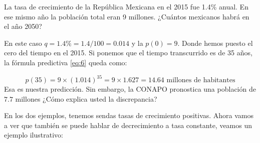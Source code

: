 \begin{ejemplo}

		\noindent La tasa de crecimiento de la República Mexicana en el 2015 fue 1.4\% anual. En ese mismo año la población total eran 9 millones. ¿Cuántos mexicanos habrá en el año 2050?
		
		En este caso $q=1.4\%=1.4/100=0.014$ y la $p(0)=9$. Donde hemos puesto el cero del tiempo en el 2015. Si ponemos que el tiempo transcurrido es de 35 años, la fórmula predictiva \ref{eq:6} queda como:
		
		\[
		p(35)=9\times(1.014)^{35}=9\times1.627=14.64 \textrm{ millones de habitantes}
		\]
		Esa es nuestra predicción. Sin embargo, la CONAPO pronostica una población de $7.7$ millones ¿Cómo explica usted la discrepancia?
		

\end{ejemplo}

En los dos ejemplos, tenemos sendas tasas de crecimiento positivas. Ahora vamos a ver que también se puede hablar de decrecimiento a tasa constante, veamos un ejemplo ilustrativo:

